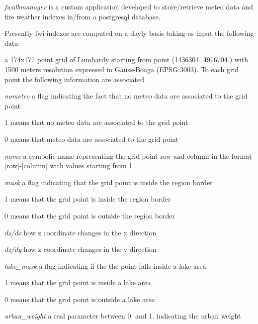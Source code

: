 {\itshape fwidbmanager} is a custom application developed to store/retrieve meteo data and fire weather indexes in/from a postgresql database.

Presently fwi indexes are computed on a dayly basis taking as input the following data\-:


\begin{DoxyItemize}
\item a 174x177 point grid of Lumbardy starting from point (1436301. 4916704.) with 1500 meters resolution expressed in Gauss-\/\-Boaga (E\-P\-S\-G\-:3003). To each grid point the following information are associated 
\begin{DoxyEnumerate}
\item {\itshape nometeo} a flag indicating the fact that no meteo data are associated to the grid point 
\begin{DoxyItemize}
\item 1 means that no meteo data are associated to the grid point 
\item 0 means that meteo data are associated to the grid point 
\end{DoxyItemize}
\item {\itshape name} a symbolic name representing the grid point row and column in the format \mbox{[}row\mbox{]}-\/\mbox{[}column\mbox{]} with values starting from 1 
\item {\itshape mask} a flag indicating that the grid point is inside the region border 
\begin{DoxyItemize}
\item 1 means that the grid point is inside the region border 
\item 0 means that the grid point is outside the region border 
\end{DoxyItemize}
\item {\itshape dz/dx} how z coordinate changes in the x direction 
\item {\itshape dz/dy} how z coordinate changes in the y direction 
\item {\itshape lake\-\_\-mask} a flag indicating if the the point falls inside a lake area 
\begin{DoxyItemize}
\item 1 means that the grid point is inside a lake area 
\item 0 means that the grid point is outside a lake area 
\end{DoxyItemize}
\item {\itshape urban\-\_\-weight} a real parameter between 0. and 1. indicating the urban weight 

\end{DoxyEnumerate}
\end{DoxyItemize}
